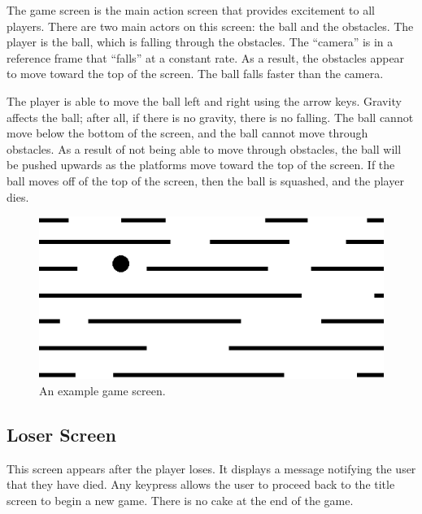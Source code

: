 \documentclass[margin,letterpaper,11pt]{scrartcl}
\begin{document}
The game screen is the main action screen that provides excitement to all
players.  There are two main actors on this screen: the ball and the
obstacles. The player is the ball, which is falling through the obstacles. The
``camera'' is in a reference frame that ``falls'' at a constant rate. As a
result, the obstacles appear to move toward the top of the screen. The ball
falls faster than the camera.

The player is able to move the ball left and right using the arrow keys.
Gravity affects the ball; after all, if there is no gravity, there is
no falling. The ball cannot move below the bottom of the screen, and
the ball cannot move through obstacles. As a result of not being
able to move through obstacles, the ball will be pushed upwards
as the platforms move toward the top of the screen. If the ball
moves off of the top of the screen, then the ball is squashed, and the player
dies.

\begin{figure}[!h]
   \begin{center}
      \includegraphics[width=4.5in]{example_screen.eps}
      \caption{An example game screen.}
   \end{center}
\end{figure}

\subsection{Loser Screen}

This screen appears after the player loses. It displays a message notifying
the user that they have died. Any keypress allows the user to proceed back to
the title screen to begin a new game. There is no cake at the end of the game.
\end{document}
